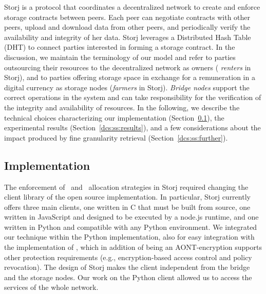 {Storj is a protocol that coordinates a decentralized network to create
and enforce storage contracts between peers. Each peer can negotiate
contracts with other peers, upload and download data from other peers,
and periodically verify the availability and integrity of her data.
Storj leverages a Distributed Hash Table (DHT) to connect parties
interested in forming a storage contract.  In the discussion, we
maintain the terminology of our model and refer to parties outsourcing
their resources to the decentralized network as owners ({\em
  renters\/} in Storj), and to parties offering storage space in
exchange for a remuneration in a digital currency as storage nodes
({\em farmers\/} in Storj).  {\em Bridge nodes\/} support the correct
operations in the system and can take responsibility for the
verification of the integrity and availability of resources. In the
following, we describe the technical choices characterizing our
implementation (Section~\ref{dcs:ss:implementation}), the experimental
results (Section~\ref{dcs:ss:results}), and a few considerations about the
impact produced by fine granularity retrieval (Section~\ref{dcs:ss:further}).
    

\subsection{Implementation}\label{dcs:ss:implementation}
The enforcement of \diagonal\ and \compact\ allocation strategies in
Storj required changing the client library of the open source
implementation.  In particular, Storj currently offers three main
clients, one written in C that must be built from source, one written
in JavaScript and designed to be executed by a node.js runtime, and
one written in Python and compatible with any Python environment. We
integrated our technique within the Python implementation, also for
easy integration with the implementation of \name, which in addition
of being an AONT-encryption supports other protection requirements
(e.g., encryption-based access control and policy revocation).  The
design of Storj makes the client independent from the bridge and the
storage nodes. Our work on the Python client allowed us to access the
services of the whole network.

}

